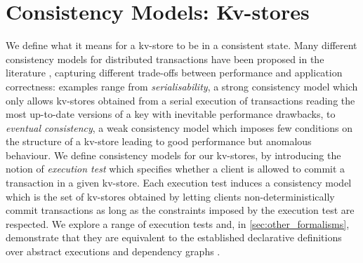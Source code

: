\section{Consistency Models: Kv-stores}
\label{sec:cm}
We define what it means for a kv-store 
to be in a consistent state. Many different consistency models for
distributed transactions have 
been proposed in the literature
\cite{principle-eventual-consistency,rola,cops,redblue,PSI,clocksi},
capturing different trade-offs 
between  performance and application
correctness: examples range from  \emph{serialisability}, a strong
consistency model which only allows kv-stores 
obtained  from a serial execution of transactions reading the most
up-to-date versions of a key with inevitable performance
drawbacks, to  \emph{eventual consistency},  a weak consistency model
which imposes few conditions on the structure of a kv-store leading to
good performance but anomalous behaviour.
We define consistency models for our kv-stores,
by introducing the notion of 
\emph{execution test} which specifies whether a client is allowed to commit a transaction in a given 
kv-store. Each execution test induces a consistency model which is  the set of kv-stores obtained 
by letting clients non-deterministically commit transactions as long
as  the constraints 
imposed by the execution test are respected.
We explore a range of execution tests  and, in
\cref{sec:other_formalisms}, 
demonstrate that they are 
 equivalent to the established declarative definitions over abstract executions \cite{framework-concur} and dependency graphs \cite{adya}.


%
%
%





%
%

